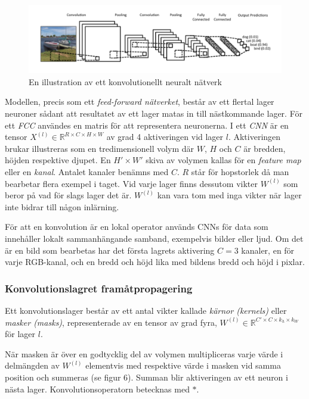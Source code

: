 \documentclass[a4paper,11pt,twoside]{article}
\begin{document}
\begin{figure}[h]\label{figboatcnn}
	\centering
  		\includegraphics[scale=0.6]{boatcnn.png}
  	\caption{En illustration av ett konvolutionellt neuralt nätverk}
\end{figure}

Modellen, precis som ett \textit{feed-forward nätverket}, består av ett flertal lager neuroner sådant att resultatet av ett lager matas in till nästkommande lager. För ett \textit{FCC} användes en matris för att representera neuronerna. I ett \textit{CNN} är en tensor $X^{(l)} \in \mathbb{R}^{R \times C  \times H \times W}$ av grad 4 aktiveringen vid lager $l$. Aktiveringen brukar illustreras som en tredimensionell volym där $W$, $H$ och $C$ är bredden, höjden respektive djupet. En $H' \times W'$ skiva av volymen kallas för en \textit{feature map} eller en \textit{kanal}. Antalet kanaler benämns med $C$. $R$ står för hopstorlek då man bearbetar flera exempel i taget. Vid varje lager finns dessutom vikter $W^{(l)}$  som beror på vad för slags lager det är. $W^{(l)}$ kan vara tom med inga vikter när lager inte bidrar till någon inlärning.

För att en konvolution är en lokal operator används CNNs för data som innehåller lokalt sammanhängande samband, exempelvis bilder eller ljud. Om det är en bild som bearbetas har det första lagrets aktivering $C = 3$ kanaler, en för varje RGB-kanal, och en bredd och höjd lika med bildens bredd och höjd i pixlar.

\subsubsection{Konvolutionslagret framåtpropagering}
Ett konvolutionslager består av ett antal vikter kallade \textit{kärnor (kernels)} eller \textit{masker (masks)}, representerade av en tensor av grad fyra, $W^{(l)} \in \mathbb{R}^{C' \times C  \times k_h \times k_W}$ för lager $l$.

När masken är över en godtycklig del av volymen multipliceras varje värde i delmängden av $W^{(l)}$ elementvis med respektive värde i masken vid samma position och summeras (se figur 6). Summan blir aktiveringen av ett neuron i nästa lager. Konvolutionsoperatorn betecknas med $*$.
\end{document}

